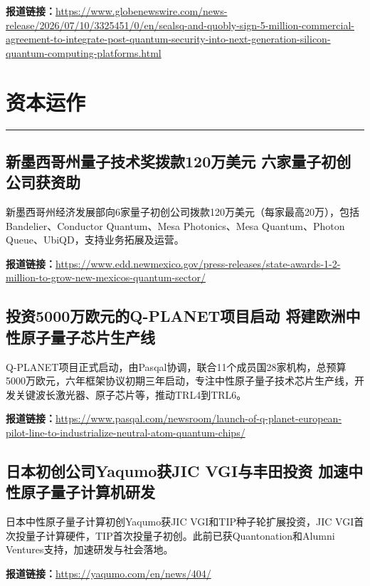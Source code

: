 \documentclass[12pt,a4paper]{ctexart}
\begin{document}
\noindent\textbf{报道链接：}\url{https://www.globenewswire.com/news-release/2026/07/10/3325451/0/en/sealsq-and-quobly-sign-5-million-commercial-agreement-to-integrate-post-quantum-security-into-next-generation-silicon-quantum-computing-platforms.html}


\newpage
\section{资本运作}
\vspace{-0.5em}
\noindent\rule{\linewidth}{1.5pt}

\subsection{ 新墨西哥州量子技术奖拨款120万美元 六家量子初创公司获资助 }

新墨西哥州经济发展部向6家量子初创公司拨款120万美元（每家最高20万），包括Bandelier、Conductor Quantum、Mesa Photonics、Mesa Quantum、Photon Queue、UbiQD，支持业务拓展及运营。

\noindent\textbf{报道链接：}\url{https://www.edd.newmexico.gov/press-releases/state-awards-1-2-million-to-grow-new-mexicos-quantum-sector/}

\subsection{ 投资5000万欧元的Q-PLANET项目启动 将建欧洲中性原子量子芯片生产线 }

Q-PLANET项目正式启动，由Pasqal协调，联合11个成员国28家机构，总预算5000万欧元，六年框架协议初期三年启动，专注中性原子量子技术芯片生产线，开发关键波长激光器、原子芯片等，推动TRL4到TRL6。

\noindent\textbf{报道链接：}\url{https://www.pasqal.com/newsroom/launch-of-q-planet-european-pilot-line-to-industrialize-neutral-atom-quantum-chips/}

\subsection{ 日本初创公司Yaqumo获JIC VGI与丰田投资 加速中性原子量子计算机研发 }

日本中性原子量子计算初创Yaqumo获JIC VGI和TIP种子轮扩展投资，JIC VGI首次投量子计算硬件，TIP首次投量子初创。此前已获Quantonation和Alumni Ventures支持，加速研发与社会落地。

\noindent\textbf{报道链接：}\url{https://yaqumo.com/en/news/404/}
\end{document}
